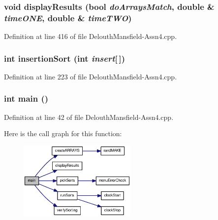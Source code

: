 \hypertarget{_delouth_mansfield-_assn4_8cpp_a95da63b4a266243c36e025d0fcc6b757}{
\subsubsection[{displayResults}]{\setlength{\rightskip}{0pt plus 5cm}void displayResults (bool {\em doArraysMatch}, \/  double \& {\em timeONE}, \/  double \& {\em timeTWO})}}
\label{_delouth_mansfield-_assn4_8cpp_a95da63b4a266243c36e025d0fcc6b757}


Definition at line 416 of file DelouthMansfield-\/Assn4.cpp.

\hypertarget{_delouth_mansfield-_assn4_8cpp_abdd451b9bf57eb321b817db4405d65fd}{
\subsubsection[{insertionSort}]{\setlength{\rightskip}{0pt plus 5cm}int insertionSort (int {\em insert}\mbox{[}$\,$\mbox{]})}}
\label{_delouth_mansfield-_assn4_8cpp_abdd451b9bf57eb321b817db4405d65fd}


Definition at line 223 of file DelouthMansfield-\/Assn4.cpp.

\hypertarget{_delouth_mansfield-_assn4_8cpp_ae66f6b31b5ad750f1fe042a706a4e3d4}{
\subsubsection[{main}]{\setlength{\rightskip}{0pt plus 5cm}int main ()}}
\label{_delouth_mansfield-_assn4_8cpp_ae66f6b31b5ad750f1fe042a706a4e3d4}


Definition at line 42 of file DelouthMansfield-\/Assn4.cpp.



Here is the call graph for this function:\nopagebreak
\begin{figure}[H]
\begin{center}
\leavevmode
\includegraphics[width=163pt]{_delouth_mansfield-_assn4_8cpp_ae66f6b31b5ad750f1fe042a706a4e3d4_cgraph}
\end{center}
\end{figure}


